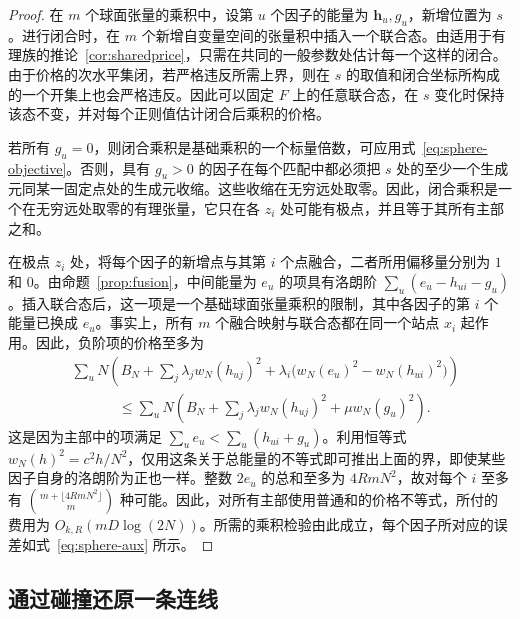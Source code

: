 \begin{proof}
在 \(m\) 个球面张量的乘积中，设第 \(u\) 个因子的能量为 \(\mathbf h_u,g_u\)，新增位置为 \(s\)。进行闭合时，在 \(m\) 个新增自变量空间的张量积中插入一个联合态。由适用于有理族的推论~\ref{cor:sharedprice}，只需在共同的一般参数处估计每一个这样的闭合。由于价格的次水平集闭，若严格违反所需上界，则在 \(s\) 的取值和闭合坐标所构成的一个开集上也会严格违反。因此可以固定 \(F\) 上的任意联合态，在 \(s\) 变化时保持该态不变，并对每个正则值估计闭合后乘积的价格。

若所有 \(g_u=0\)，则闭合乘积是基础乘积的一个标量倍数，可应用式~\eqref{eq:sphere-objective}。否则，具有 \(g_u>0\) 的因子在每个匹配中都必须把 \(s\) 处的至少一个生成元同某一固定点处的生成元收缩。这些收缩在无穷远处取零。因此，闭合乘积是一个在无穷远处取零的有理张量，它只在各 \(z_i\) 处可能有极点，并且等于其所有主部之和。

在极点 \(z_i\) 处，将每个因子的新增点与其第 \(i\) 个点融合，二者所用偏移量分别为 \(1\) 和 \(0\)。由命题~\ref{prop:fusion}，中间能量为 \(e_u\) 的项具有洛朗阶 \(\sum_u(e_u-h_{ui}-g_u)\)。插入联合态后，这一项是一个基础球面张量乘积的限制，其中各因子的第 \(i\) 个能量已换成 \(e_u\)。事实上，所有 \(m\) 个融合映射与联合态都在同一个站点 \(x_i\) 起作用。因此，负阶项的价格至多为
\begin{align*}
 &\sum_u N\left(B_N+\sum_j\lambda_j w_N(h_{uj})^2
             +\lambda_i\bigl(w_N(e_u)^2-w_N(h_{ui})^2\bigr)\right)
 \\
 &\hspace{40pt}\le \sum_u N\left(B_N+\sum_j\lambda_j w_N(h_{uj})^2
                      +\mu w_N(g_u)^2\right).
\end{align*}
这是因为主部中的项满足 \(\sum_u e_u<\sum_u(h_{ui}+g_u)\)。利用恒等式 \(w_N(h)^2=c^2h/N^2\)，仅用这条关于总能量的不等式即可推出上面的界，即使某些因子自身的洛朗阶为正也一样。整数 \(2e_u\) 的总和至多为 \(4RmN^2\)，故对每个 \(i\) 至多有 \(\binom{m+\lfloor4RmN^2\rfloor}{m}\) 种可能。因此，对所有主部使用普通和的价格不等式，所付的费用为 \(O_{k,R}(mD\log(2N))\)。所需的乘积检验由此成立，每个因子所对应的误差如式~\eqref{eq:sphere-aux} 所示。
\end{proof}

\subsection{通过碰撞还原一条连线}

